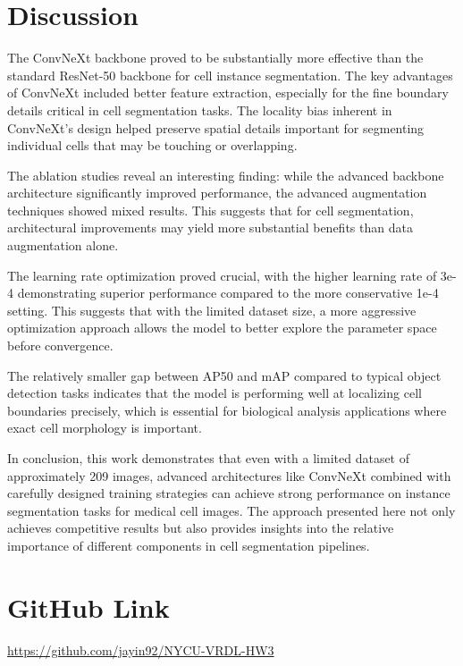 \documentclass[twocolumn,a4paper]{article}
\begin{document}
\section{Discussion}

The ConvNeXt backbone proved to be substantially more effective than the standard ResNet-50 backbone for cell instance segmentation. The key advantages of ConvNeXt included better feature extraction, especially for the fine boundary details critical in cell segmentation tasks. The locality bias inherent in ConvNeXt's design helped preserve spatial details important for segmenting individual cells that may be touching or overlapping.

The ablation studies reveal an interesting finding: while the advanced backbone architecture significantly improved performance, the advanced augmentation techniques showed mixed results. This suggests that for cell segmentation, architectural improvements may yield more substantial benefits than data augmentation alone.

The learning rate optimization proved crucial, with the higher learning rate of 3e-4 demonstrating superior performance compared to the more conservative 1e-4 setting. This suggests that with the limited dataset size, a more aggressive optimization approach allows the model to better explore the parameter space before convergence.

The relatively smaller gap between AP50 and mAP compared to typical object detection tasks indicates that the model is performing well at localizing cell boundaries precisely, which is essential for biological analysis applications where exact cell morphology is important.


In conclusion, this work demonstrates that even with a limited dataset of approximately 209 images, advanced architectures like ConvNeXt combined with carefully designed training strategies can achieve strong performance on instance segmentation tasks for medical cell images. The approach presented here not only achieves competitive results but also provides insights into the relative importance of different components in cell segmentation pipelines.

\section{GitHub Link}
\noindent\url{https://github.com/jayin92/NYCU-VRDL-HW3}




\end{document}
